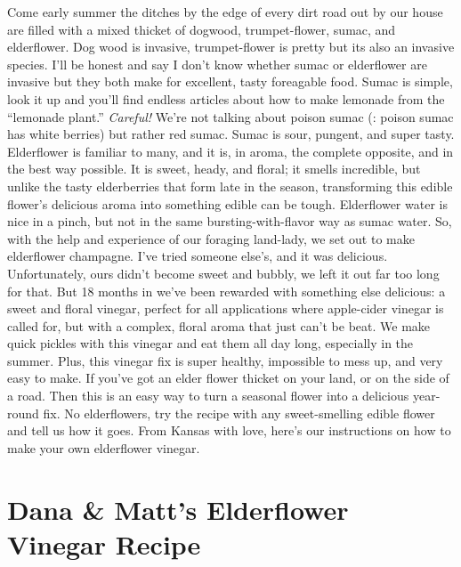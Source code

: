 \documentclass[10pt,a6paper,footinclude=false,firstfoot=false,headinclude=true,open=any,DIV=6]{scrbook} %
\begin{document}
Come early summer the ditches by the edge of every dirt road out by our house are filled with a mixed thicket of dogwood, trumpet-flower, sumac, and elderflower. Dog wood is invasive, trumpet-flower is pretty but its also an invasive species. I'll be honest and say I don't know whether sumac or elderflower are invasive but they both make for excellent, tasty foreagable food. Sumac is simple, look it up and you'll find endless articles about how to make lemonade from the ``lemonade plant.'' \textit{Careful!} We're not talking about poison sumac (: poison sumac has white berries) but rather red sumac. Sumac is sour, pungent, and super tasty. Elderflower is familiar to many, and it is, in aroma, the complete opposite, and in the best way possible. It is sweet, heady, and floral; it smells incredible, but unlike the tasty elderberries that form late in the season, transforming this edible flower's delicious aroma into something edible can be tough. Elderflower water is nice in a pinch, but not in the same bursting-with-flavor way as sumac water. So, with the help and experience of our foraging land-lady, we set out to make elderflower champagne. I've tried someone else's, and it was delicious. Unfortunately, ours didn't become sweet and bubbly, we left it out far too long for that. But 18 months in we've been rewarded with something else delicious: a sweet and floral vinegar, perfect for all applications where apple-cider vinegar is called for, but with a complex, floral aroma that just can't be beat. We make quick pickles with this vinegar and eat them all day long, especially in the summer. Plus, this vinegar fix is super healthy, impossible to mess up, and very easy to make. If you've got an elder flower thicket on your land, or on the side of a road. Then this is an easy way to turn a seasonal flower into a delicious year-round fix. No elderflowers, try the recipe with any sweet-smelling edible flower and tell us how it goes. From Kansas with love, here's our instructions on how to make your own elderflower vinegar.

\section*{Dana \& Matt's Elderflower Vinegar Recipe}
\end{document}
